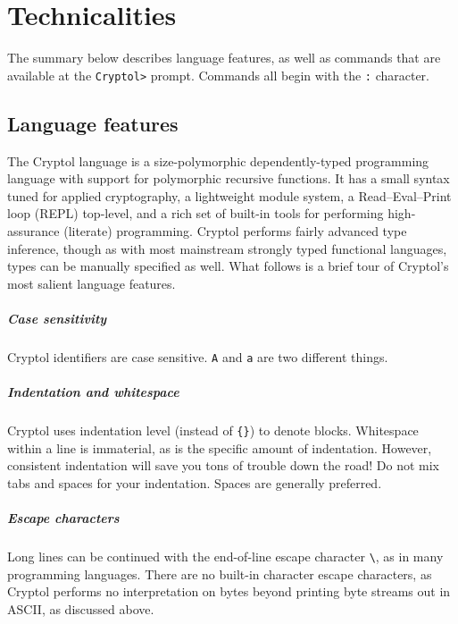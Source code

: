 \chapter{Technicalities}
\label{sec:technicalities}

The summary below describes language
features, as well as commands that are available at the {\tt Cryptol>}
prompt. Commands all begin with the {\tt :} character.

\section{Language features}
\label{sec:language-features}

The Cryptol language is a size-polymorphic dependently-typed
programming language with support for polymorphic recursive functions.
It has a small syntax tuned for applied cryptography, a lightweight
module system, a Read--Eval--Print loop (REPL) top-level, and a
rich set of built-in tools for performing high-assurance (literate)
programming.  Cryptol performs fairly advanced type inference, though
as with most mainstream strongly typed functional languages, types can
be manually specified as well.  What follows is a brief tour of
Cryptol's most salient language features.

\paragraph*{Case sensitivity}
Cryptol identifiers are case sensitive. {\tt A} and {\tt a} are two
different things.\indCaseSensitive

\paragraph*{Indentation and whitespace}
Cryptol uses indentation level (instead of \texttt{\{\}}) to denote blocks.
Whitespace within a line is immaterial, as is the specific amount of
indentation.  However, consistent indentation will save you tons of
trouble down the road!  Do not mix tabs and spaces for your
indentation.  Spaces are generally preferred.

\paragraph*{Escape characters}
Long lines can be continued with the end-of-line escape character
\texttt{\textbackslash}, as in many programming languages.\indLineCont
There are no built-in character escape characters, as Cryptol performs
no interpretation on bytes beyond printing byte streams out in ASCII,
as discussed above.

